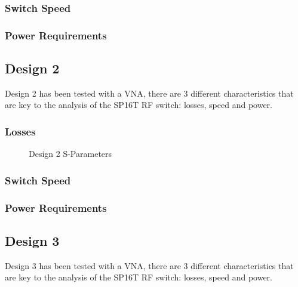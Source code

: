 \documentclass[12pt,openany,a4paper]{book}
\begin{document}



\subsubsection{Switch Speed}

\subsubsection{Power Requirements}



\subsection{Design 2}
Design 2 has been tested with a VNA, there are $3$ different characteristics that are key to the analysis of the SP16T RF switch: losses, speed and power.

\subsubsection{Losses}
\begin{figure}[H]
	\centering
	\caption{Design 2 S-Parameters}
	\label{fig:design2_sma}
\end{figure} 




\subsubsection{Switch Speed}

\subsubsection{Power Requirements}


\subsection{Design 3}
Design 3 has been tested with a VNA, there are $3$ different characteristics that are key to the analysis of the SP16T RF switch: losses, speed and power.
\end{document}
